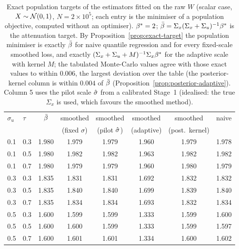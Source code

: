 \begin{table}[ht]
\centering
\footnotesize
\caption{Exact population targets of the estimators fitted on the raw $W$ (scalar case, $X\sim\mathcal{N}(0,1)$, $N=2\times10^5$; each entry is the minimiser of a population objective, computed without an optimiser). $\beta^*=2$; $\bar{\beta}=\Sigma_x(\Sigma_x+\Sigma_u)^{-1}\beta^*$ is the attenuation target. By Proposition~\ref{prop:exact-target} the population minimiser is exactly $\bar{\beta}$ for naive quantile regression and for every fixed-scale smoothed loss, and exactly $(\Sigma_x+\Sigma_u+M)^{-1}\Sigma_x\beta^*$ for the adaptive scale with kernel $M$; the tabulated Monte-Carlo values agree with those exact values to within $0.006$, the largest deviation over the table (the posterior-kernel column is within $0.004$ of $\bar{\beta}$ (Proposition~\ref{prop:posterior-adaptive}). Column 5 uses the pilot scale $\hat{\sigma}$ from a calibrated Stage~1 (idealised: the true $\Sigma_x$ is used, which favours the smoothed method).}
\label{tab:targets}
\begin{tabular}{llcccccc}
\toprule
$\sigma_u$ & $\tau$ & $\bar{\beta}$ & smoothed & smoothed & smoothed & smoothed & naive \\
 & & & (fixed $\sigma$) & (pilot $\hat{\sigma}$) & (adaptive) & (post.\ kernel) & \\
\midrule
0.1 & 0.3 & 1.980 & 1.979 & 1.979 & 1.960 & 1.979 & 1.978 \\
0.1 & 0.5 & 1.980 & 1.982 & 1.982 & 1.963 & 1.982 & 1.982 \\
0.1 & 0.7 & 1.980 & 1.979 & 1.979 & 1.960 & 1.980 & 1.979 \\
\midrule
0.3 & 0.3 & 1.835 & 1.831 & 1.831 & 1.692 & 1.832 & 1.832 \\
0.3 & 0.5 & 1.835 & 1.840 & 1.840 & 1.699 & 1.839 & 1.840 \\
0.3 & 0.7 & 1.835 & 1.834 & 1.834 & 1.693 & 1.832 & 1.834 \\
\midrule
0.5 & 0.3 & 1.600 & 1.599 & 1.599 & 1.333 & 1.599 & 1.600 \\
0.5 & 0.5 & 1.600 & 1.600 & 1.599 & 1.333 & 1.599 & 1.597 \\
0.5 & 0.7 & 1.600 & 1.601 & 1.601 & 1.334 & 1.600 & 1.602 \\
\bottomrule
\end{tabular}
\end{table}
